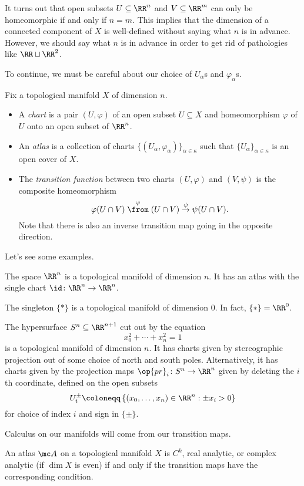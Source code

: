 \documentclass[../notes.tex]{subfiles}
\begin{document}
\begin{remark}
	It turns out that open subsets $U\subseteq\RR^n$ and $V\subseteq\RR^m$ can only be homeomorphic if and only if $n=m$. This implies that the dimension of a connected component of $X$ is well-defined without saying what $n$ is in advance. However, we should say what $n$ is in advance in order to get rid of pathologies like $\RR\sqcup\RR^2$.
\end{remark}
To continue, we must be careful about our choice of $U_\alpha$s and $\varphi_\alpha$s.
\begin{defihelper}   
	Fix a topological manifold $X$ of dimension $n$.
	\begin{itemize}
		\item A \textit{chart} is a pair $(U,\varphi)$ of an open subset $U\subseteq X$ and homeomorphism $\varphi$ of $U$ onto an open subset of $\RR^n$.
		\item An \textit{atlas} is a collection of charts $\{(U_\alpha,\varphi_\alpha)\}_{\alpha\in\kappa}$ such that $\{U_\alpha\}_{\alpha\in\kappa}$ is an open cover of $X$.
		\item The \textit{transition function} between two charts $(U,\varphi)$ and $(V,\psi)$ is the composite homeomorphism
		\[\varphi(U\cap V)\stackrel\varphi\from (U\cap V)\stackrel\psi\to\psi(U\cap V).\]
		Note that there is also an inverse transition map going in the opposite direction.
	\end{itemize}
\end{defihelper}
Let's see some examples.
\begin{example}
	The space $\RR^n$ is a topological manifold of dimension $n$. It has an atlas with the single chart $\id\colon\RR^n\to\RR^n$.
\end{example}
\begin{example}
	The singleton $\{*\}$ is a topological manifold of dimension $0$. In fact, $\{*\}=\RR^0$.
\end{example}
\begin{example}
	The hypersurface $S^n\subseteq\RR^{n+1}$ cut out by the equation
	\[x_0^2+\cdots+x_n^2=1\]
	is a topological manifold of dimension $n$. It has charts given by stereographic projection out of some choice of north and south poles. Alternatively, it has charts given by the projection maps $\op{pr}_i\colon S^n\to\RR^n$ given by deleting the $i$th coordinate, defined on the open subsets
	\[U_i^\pm\coloneqq\left\{(x_0,\ldots,x_n)\in\RR^n:\pm x_i>0\right\}\]
	for choice of index $i$ and sign in $\{\pm\}$.
\end{example}
Calculus on our manifolds will come from our transition maps.
\begin{definition}
	An atlas $\mc A$ on a topological manifold $X$ is $C^k$, real analytic, or complex analytic (if $\dim X$ is even) if and only if the transition maps have the corresponding condition.
\end{definition}
\end{document}
